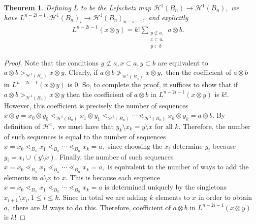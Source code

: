 \documentclass{amsart}
\newtheorem{thm}{Theorem}[subsection]
\theoremstyle{remark}
\newcommand\fbn{\mathcal H}
\begin{document}
\begin{thm}
\label{explicit_gbn_lefchetz}
Defining $L$ to be the Lefschetz map $\mathcal H^1(B_n) \rightarrow \mathcal H^1(B_n),$ we have $L^{n-2i-1}:\fbn^1(B_n)_i \rightarrow \fbn^1(B_n)_{n-i-1},$ and explicitly 
\begin{align*}
	L^{n-2i-1}(x\otimes y)= k!\sum_{\substack{{y \not \subset a,}\\{x\subset a,}\\{y \subset b}}}^{}a \otimes b.
\end{align*}
\end{thm}
\begin{proof}
Note that the conditions $y \not \subset a, x\subset a, y\subset b$ are equivalent to $a\otimes b >_{\mathcal H^1(B_n)} x \otimes y.$ Clearly, if $a\otimes b \not >_{\mathcal H^1(B_n)} x \otimes y,$ then the coefficient of $a\otimes b$ in $	L^{n-2i-1}(x\otimes y)$ is 0. So, to complete the proof, it suffices to show that if  $a\otimes b >_{\mathcal H^1(B_n)} x \otimes y$ then the coefficient of $a\otimes b$ in $	L^{n-2i-1}(x\otimes y)$ is $k!$. However, this coefficient is precisely the number of sequences $x\otimes y = x_0\otimes y_0 \lessdot_{\mathcal H^1(B_n)} x_1 \otimes y_1 \lessdot_{\mathcal H^1(B_n)}  \cdots \lessdot_{\mathcal H^1(B_n)}  x_k \otimes y_k = a\otimes b.$ By definition of $\mathcal H^1,$ we must have that $y_k \setminus x_k = y\setminus x$ for all $k.$ Therefore, the number of such sequences is equal to the number of sequences $x=x_0 \lessdot_{B_n} x_1 \lessdot_{B_n} \cdots \lessdot_{B_n} x_k = a,$ since choosing the $x_i$ determine $y_i$ because $y_i = x_i \cup (y \setminus x).$ Finally, the number of such sequences  $x=x_0 \lessdot_{B_n} x_1 \lessdot_{B_n} \cdots \lessdot_{B_n} x_k = a,$ is equivalent to the number of ways to add the elements in $a \setminus x$ to $x$. This is because each sequence $x=x_0 \lessdot_{B_n} x_1 \lessdot_{B_n} \cdots \lessdot_{B_n} x_k = a$ is determined uniquely by the singletons $x_{i+1} \setminus x_i, 1 \leq i \leq k.$ Since in total we are adding $k$ elements to $x$ in order to obtain $a,$ there are $k!$ ways to do this. Therefore, coefficient of $a\otimes b$ in $	L^{n-2i-1}(x\otimes y)$ is $k!$
\end{proof}
\end{document}
